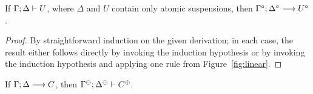 \bigskip
\begin{theorem}
If ${\Gamma};{\Delta} \vdash {U} \mathstrut$, where $\Delta$ and $U$ contain only
atomic suspensions, then ${\Gamma^\circ};{\Delta^\circ} \longrightarrow {U^\circ} \mathstrut$.
\end{theorem}

\begin{proof}
  By straightforward induction on the given derivation; in each case,
  the result either follows directly by invoking the induction
  hypothesis or by invoking the induction hypothesis and applying one
  rule from Figure~\ref{fig:linear}.
\end{proof}

\begin{theorem}\label{thm:linfoccomplete}
If ${\Gamma};{\Delta} \longrightarrow {C} \mathstrut$,
then ${\Gamma^\ominus};{\Delta^\ominus} \vdash {C^\oplus} \mathstrut$. 
\end{theorem}

